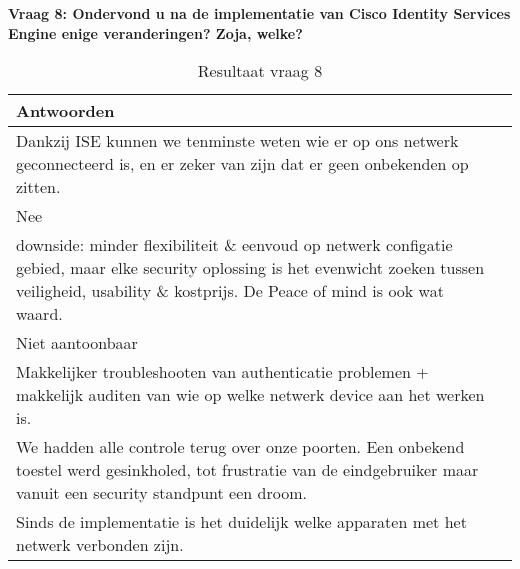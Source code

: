 \newpage
\textbf{Vraag 8: Ondervond u na de implementatie van Cisco Identity Services Engine enige veranderingen? Zoja, welke?}
\begin{table}[H]
	\begin{center}
		\newlength\q
		\setlength{}
		\noindent\begin{tabular}{p{\q}p{\q}}	
		\hline
		\bf Antwoorden \\ \hline
		Dankzij ISE kunnen we tenminste weten wie er op ons netwerk geconnecteerd is, en er zeker van zijn dat er geen onbekenden op zitten.                                                                       \\ \hline
		Nee                                                                                                                                                                                                        \\ \hline
		downside: minder flexibiliteit \& eenvoud op netwerk configatie gebied, maar elke security oplossing is het evenwicht zoeken tussen veiligheid, usability \& kostprijs. De Peace of mind is ook wat waard. \\ \hline
		Niet aantoonbaar                                                                                                                                                                                           \\ \hline
		Makkelijker troubleshooten van authenticatie problemen + makkelijk auditen van wie op welke netwerk device aan het werken is.                                                                              \\ \hline
		We hadden alle controle terug over onze poorten. Een onbekend toestel werd gesinkholed, tot frustratie van de eindgebruiker maar vanuit een security standpunt een droom.                                  \\ \hline
		Sinds de implementatie is het duidelijk welke apparaten met het netwerk verbonden zijn. \\ \hline
		\end{tabular}
		\caption{Resultaat vraag 8}
		\label{tab:vraag8}
	\end{center}
\end{table}

